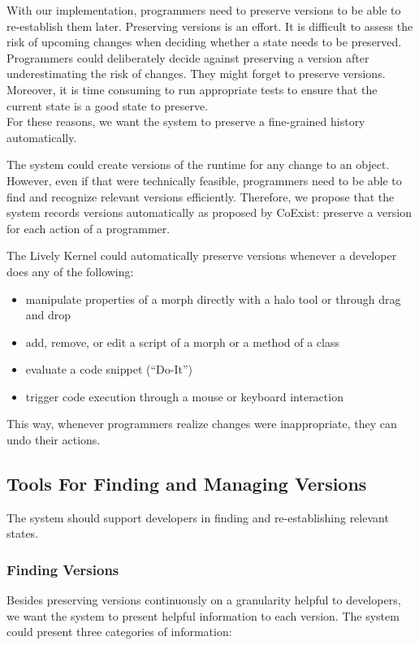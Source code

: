 With our implementation, programmers need to preserve versions to be able to re-establish them later.
Preserving versions is an effort.
It is difficult to assess the risk of upcoming changes when deciding whether a state needs to be preserved.
Programmers could deliberately decide against preserving a version after underestimating the risk of changes.
They might forget to preserve versions.
Moreover, it is time consuming to run appropriate tests to ensure that the current state is a good state to preserve.\\
For these reasons, we want the system to preserve a fine-grained history automatically.

The system could create versions of the runtime for any change to an object.
However, even if that were technically feasible, programmers need to be able to find and recognize relevant versions efficiently.
Therefore, we propose that the system records versions automatically as proposed by CoExist: preserve a version for each action of a programmer.

The Lively Kernel could automatically preserve versions whenever a developer does any of the following:
\begin{itemize}
    \item manipulate properties of a morph directly with a halo tool or through drag and drop
    \item add, remove, or edit a script of a morph or a method of a class
    \item evaluate a code snippet (``Do-It'')
    \item trigger code execution through a mouse or keyboard interaction
\end{itemize}

This way, whenever programmers realize changes were inappropriate, they can undo their actions.


\subsection{Tools For Finding and Managing Versions}

The system should support developers in finding and re-establishing relevant states.

\subsubsection{Finding Versions}

Besides preserving versions continuously on a granularity helpful to developers, we want the system to present helpful information to each version.
The system could present three categories of information:

